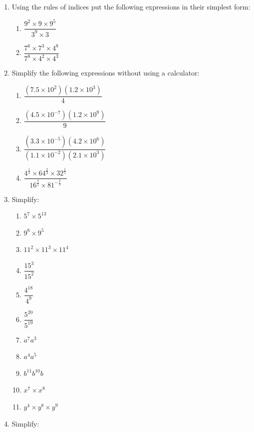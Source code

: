 \documentclass[
  english,
  12pt,
  oneside]{book}
\providecommand{\tightlist}{%
  \setlength{\itemsep}{0pt}\setlength{\parskip}{0pt}}
\theoremstyle{definition}
\theoremstyle{definition}
\theoremstyle{definition}
\theoremstyle{definition}
\theoremstyle{remark}
\begin{document}
\begin{enumerate}
\def\labelenumi{\arabic{enumi}.}
\item
  Using the rules of indices put the following expressions in their simplest form:

  \begin{enumerate}
  \def\labelenumii{\roman{enumii})}
  \tightlist
  \item
    \(\dfrac{9^2\times 9\times 9^5}{3^9\times 3}\)
  \item
    \(\dfrac{7^6\times 7^3\times 4^8}{7^8\times 4^2\times 4^3}\)
  \end{enumerate}
\item
  Simplify the following expressions without using a calculator:

  \begin{enumerate}
  \def\labelenumii{\roman{enumii})}
  \tightlist
  \item
    \(\dfrac{(7.5\times 10^2)(1.2\times 10^3)}{4}\)
  \item
    \(\dfrac{(4.5\times 10^{-7})(1.2\times 10^9)}{9}\)
  \item
    \(\dfrac{(3.3\times10^{-5})(4.2\times 10^6)}{(1.1\times10^{-2})(2.1\times 10^3)}\)
  \item
    \(\dfrac{4^{\frac12}\times 64^{\frac23}\times 32^{\frac15}}{16^{\frac32}\times 81^{-\frac34}}\)
  \end{enumerate}
\item
  Simplify:

  \begin{enumerate}
  \def\labelenumii{\alph{enumii})}
  \tightlist
  \item
    \(5^7\times 5^{13}\)
  \item
    \(9^8\times 9^5\)
  \item
    \(11^2\times11^3\times11^4\)
  \item
    \(\dfrac{15^3}{15^2}\)
  \item
    \(\dfrac{4^{18}}{4^9}\)
  \item
    \(\dfrac{5^{20}}{5^{19}}\)
  \item
    \(a^7a^3\)
  \item
    \(a^4a^5\)
  \item
    \(b^{11}b^{10}b\)
  \item
    \(x^{7}\times x^{8}\)
  \item
    \(y^4\times y^8\times y^9\)
  \end{enumerate}
\item
  Simplify:


\end{enumerate}
\end{document}
